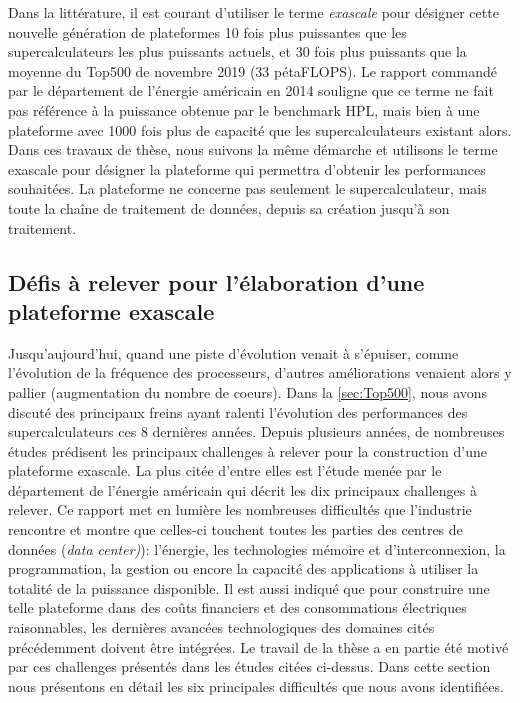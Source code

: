         Dans la littérature, il est courant d'utiliser le terme \textit{exascale} pour désigner cette nouvelle génération de plateformes 10 fois plus puissantes que les supercalculateurs les plus puissants actuels, et 30 fois plus puissants que la moyenne du Top500 de novembre 2019 (33 pétaFLOPS). Le rapport commandé par le département de l'énergie américain en 2014 \cite{Lucas2014} souligne que ce terme ne fait pas référence à la puissance obtenue par le benchmark HPL, mais bien à une plateforme avec 1000 fois plus de capacité que les supercalculateurs existant alors. Dans ces travaux de thèse, nous suivons la même démarche et utilisons le terme exascale pour désigner la plateforme qui permettra d'obtenir les performances souhaitées. La plateforme ne concerne pas seulement le supercalculateur, mais toute la chaîne de traitement de données, depuis sa création jusqu'à son traitement.


\subsection{Défis à relever pour l'élaboration d'une plateforme exascale} \label{sec:challenges}

        
    Jusqu'aujourd'hui, quand une piste d'évolution venait à s'épuiser, comme l'évolution de la fréquence des processeurs, d'autres améliorations venaient alors y pallier (augmentation du nombre de coeurs). Dans la \autoref{sec:Top500}, nous avons discuté des principaux freins ayant ralenti l'évolution des performances des supercalculateurs ces 8 dernières années. Depuis plusieurs années, de nombreuses études \cite{Shalf2010, bergman2008exascale, Bergman2011} prédisent les principaux challenges à relever pour la construction d'une plateforme exascale. La plus citée d'entre elles est l'étude menée par le département de l'énergie américain \cite{Lucas2014} qui décrit les dix principaux challenges à relever. Ce rapport met en lumière les nombreuses difficultés que l'industrie rencontre et montre que celles-ci touchent toutes les parties des centres de données (\textit{data center)}): l'énergie, les technologies mémoire et d'interconnexion, la programmation, la gestion ou encore la capacité des applications à utiliser la totalité de la puissance disponible. 
    Il est aussi indiqué que pour construire une telle plateforme dans des coûts financiers et des consommations électriques raisonnables, les dernières avancées technologiques des domaines cités précédemment doivent être intégrées. Le travail de la thèse a en partie été motivé par ces challenges présentés dans les études citées ci-dessus. Dans cette section nous présentons en détail les six principales difficultés que nous avons identifiées. 

